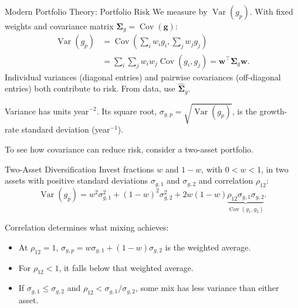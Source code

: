 \documentclass[aspectratio=169,11pt]{beamer}
\newcommand{\Var}{\operatorname{Var}}
\newcommand{\Cov}{\operatorname{Cov}}
\newcommand{\bw}{\mathbf{w}}
\newcommand{\bg}{\mathbf{g}}
\newcommand{\Sig}{\boldsymbol{\Sigma}_{g}}
\newcommand{\Sg}{\hat{\boldsymbol{\Sigma}}_{g}}
\begin{document}
\begin{frame}{Modern Portfolio Theory: Portfolio Risk}
  We measure  by $\Var(g_p)$. With fixed weights and
  covariance matrix $\Sig=\Cov(\bg)$:
  \[
    \boxed{
    \begin{aligned}
      \Var(g_p)
        &=\Cov\!\left(\sum_iw_i g_i,\sum_jw_j g_j\right)\\[0.3em]
        &=\sum_i\sum_jw_iw_j\Cov(g_i,g_j)
        =\bw^{\top}\Sig\bw.
    \end{aligned}}
  \]
  Individual variances (diagonal entries) and pairwise covariances
  (off-diagonal entries) both contribute to risk. From data, use $\Sg$.

  \vspace{0.5em}
  Variance has units year$^{-2}$. Its square root,
  $\sigma_{g,p}=\sqrt{\Var(g_p)}$, is the growth-rate standard deviation
  (year$^{-1}$).

  \vspace{0.5em}
  To see how covariance can reduce risk, consider a two-asset portfolio.
\end{frame}

\begin{frame}{Two-Asset Diversification}
  Invest fractions $w$ and $1-w$, with $0<w<1$, in two assets with positive
  standard deviations $\sigma_{g,1}$ and $\sigma_{g,2}$ and correlation $\rho_{12}$:
  \[
    \Var(g_p)=w^2\sigma_{g,1}^2+(1-w)^2\sigma_{g,2}^2
      +2w(1-w)\underbrace{\rho_{12}\sigma_{g,1}\sigma_{g,2}}_{\Cov(g_1,g_2)}.
  \]

  Correlation determines what mixing achieves:
  \begin{itemize}\setlength{\itemsep}{0.3em}
    \item At $\rho_{12}=1$, $\sigma_{g,p}=w\sigma_{g,1}+(1-w)\sigma_{g,2}$ is the weighted average.
    \item For $\rho_{12}<1$, it falls below that weighted average.
    \item If $\sigma_{g,1}\leq\sigma_{g,2}$ and $\rho_{12}<\sigma_{g,1}/\sigma_{g,2}$,
      some mix has less variance than either asset.
  \end{itemize}
\end{frame}
\end{document}
